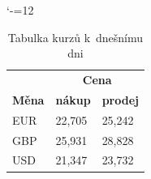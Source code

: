 \documentclass[a4paper, 11pt]{article}
\begin{document}
			\bigskip
			\begin{table}[h]
				\catcode`-=12
				\centering
				\begin{tabular}{|l|ll|}
					\hline
					\multicolumn{1}{|c|}{\textbf{}} & \multicolumn{2}{c|}{\textbf{Cena}}                    \\ \cline{2-3} 
					\textbf{Měna} & \multicolumn{1}{l|}{\textbf{nákup}} & \textbf{prodej} \\ \hline
					EUR            & \multicolumn{1}{l|}{22,705}          & 25,242          \\
					GBP            & \multicolumn{1}{l|}{25,931}          & 28,828          \\
					USD            & \multicolumn{1}{l|}{21,347}          & 23,732          \\ \hline
				\end{tabular}
				\caption{Tabulka kurzů k~dnešnímu dni}\label{tab:meny}
			\end{table}
									
\end{document}
